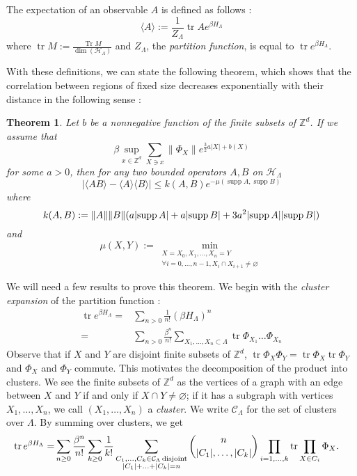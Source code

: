\documentclass{article}
\DeclarePairedDelimiter\abs{\lvert}{\rvert}
\newtheorem{thm}{Theorem}
\DeclareMathOperator{\Tr}{Tr}
\DeclareMathOperator{\disj}{disjoint}
\DeclareMathOperator{\tr}{tr}
\DeclareMathOperator{\supp}{supp}
\begin{document}
 The expectation of an observable $A$ is defined as follows :
 $$
 \langle A \rangle := \frac{1}{Z_\Lambda}\tr Ae^{\beta H_\Lambda}
 $$
 where $\tr M:=\frac{\Tr M}{\dim(\mathcal H_\Lambda)}$ and $Z_\Lambda$, the {\it partition function}, is equal to $\tr e^{\beta H_\Lambda}$.
 
 With these definitions, we can state the following theorem, which shows that the correlation between regions of fixed size decreases exponentially with their distance in the following sense :
 \begin{thm}
     \label{thm:exp_decay_of_correlations}
     Let $b$ be a nonnegative function of the finite subsets of $\mathbb Z^d$.
     If we assume that 
     $$\beta\sup_{x\in\mathbb Z^d}\sum_{X\ni x}\lVert\Phi_X\rVert e^{\frac{3}{2}a|X|+b(X)}$$ 
     for some $a>0$, then for any two bounded operators $A,B$ on $\mathcal H_\Lambda$
     $$|\langle AB\rangle - \langle A\rangle\langle B\rangle|\leq k(A,B)e^{-\mu(\supp A,\supp B)}$$
     where $$k(A,B):=\lVert A\rVert\lVert B\rVert(a\abs{\supp A}+a\abs{\supp B} + 3a^2\abs{\supp A}\abs{\supp B})$$ and 
     $$
     \mu(X,Y):= \min_{\substack{X=X_0,X_1,\ldots,X_n=Y \\ \forall i=0,\ldots,n-1, X_i\cap X_{i+1}\neq \varnothing}}
     $$
 \end{thm}
    We will need a few results to prove this theorem.
     We begin with the {\it cluster expansion} of the partition function :
     \begin{align*}
         \tr e^{\beta H_\Lambda}=&\sum_{n>0}\frac{1}{n!}(\beta H_\Lambda)^n\\
         =&\sum_{n>0}\frac{\beta^n}{n!}\sum_{X_1,\ldots, X_n\subset \Lambda}\tr\Phi_{X_1}\ldots\Phi_{X_n}
     \end{align*}
     Observe that if $X$ and $Y$ are disjoint finite subsets of $\mathbb Z^d$, $\tr \Phi_X\Phi_Y=\tr \Phi_X \tr\Phi_Y$ and $\Phi_X$ and $\Phi_Y$ commute.
    This motivates the decomposition of the product into clusters.
    We see the finite subsets of $\mathbb Z^d$ as the vertices of a graph with an edge between $X$ and $Y$ if and only if $X\cap Y\neq \varnothing$; if it has a subgraph with vertices $X_1,\ldots,X_n$, we call $(X_1,\ldots,X_n)$ a {\it cluster}.
    We write $\mathcal C_\Lambda$ for the set of clusters over $\Lambda$.
    By summing over clusters, we get 
    \begin{align*}
        \tr e^{\beta H_\Lambda}=&\sum_{n\geq0}\frac {\beta^n} {n!} \sum_{k\geq 0}\frac{1}{k!}\sum_{\substack{C_1,\ldots,C_k\in\mathcal C_\Lambda \disj\\\abs{C_1}+\ldots+\abs{C_k}=n}}\binom{n}{\abs{C_1},\ldots,\abs{C_k}}\prod_{i=1,\ldots,k}\tr\prod_{X\in C_i}\Phi_X.
    \end{align*}
\end{document}
